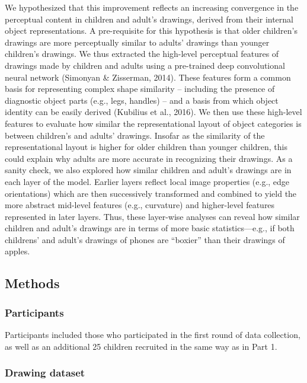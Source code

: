 \documentclass[10pt, letterpaper]{article}
\begin{document}
We hypothesized that this improvement reflects an increasing convergence
in the perceptual content in children and adult's drawings, derived from
their internal object representations. A pre-requisite for this
hypothesis is that older children's drawings are more perceptually
similar to adults' drawings than younger children's drawings. We thus
extracted the high-level perceptual features of drawings made by
children and adults using a pre-trained deep convolutional neural
network (Simonyan \& Zisserman, 2014). These features form a common
basis for representing complex shape similarity -- including the
presence of diagnostic object parts (e.g., legs, handles) -- and a basis
from which object identity can be easily derived (Kubilius et al.,
2016). We then use these high-level features to evaluate how similar the
representational layout of object categories is between children's and
adults' drawings. Insofar as the similarity of the representational
layout is higher for older children than younger children, this could
explain why adults are more accurate in recognizing their drawings. As a
sanity check, we also explored how similar children and adult's drawings
are in each layer of the model. Earlier layers reflect local image
properties (e.g., edge orientations) which are then successively
transformed and combined to yield the more abstract mid-level features
(e.g., curvature) and higher-level features represented in later layers.
Thus, these layer-wise analyses can reveal how similar children and
adult's drawings are in terms of more basic statistics---e.g., if both
childrens' and adult's drawings of phones are ``boxier'' than their
drawings of apples.

\subsection{Methods}\label{methods-1}

\subsubsection{Participants}\label{participants-1}

Participants included those who participated in the first round of data
collection, as well as an additional 25 children recruited in the same
way as in Part 1.

\subsubsection{Drawing dataset}\label{drawing-dataset}
\end{document}
